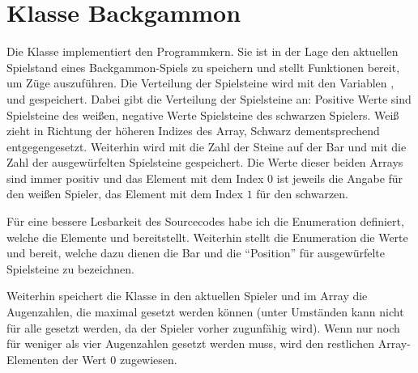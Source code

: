 \chapter{Klasse Backgammon}
Die Klasse  implementiert den Programmkern. Sie ist in der Lage den aktuellen Spielstand eines Backgammon-Spiels zu speichern und stellt Funktionen bereit, um Züge auszuführen. Die Verteilung der Spielsteine wird mit den Variablen ,  und  gespeichert. Dabei gibt  die Verteilung der Spielsteine an: Positive Werte sind Spielsteine des weißen, negative Werte Spielsteine des schwarzen Spielers. Weiß zieht in Richtung der höheren Indizes des Array, Schwarz dementsprechend entgegengesetzt. Weiterhin wird mit  die Zahl der Steine auf der Bar und mit  die Zahl der ausgewürfelten Spielsteine gespeichert. Die Werte dieser beiden Arrays sind immer positiv und das Element mit dem Index $0$ ist jeweils die Angabe für den weißen Spieler, das Element mit dem Index $1$ für den schwarzen.

Für eine bessere Lesbarkeit des Sourcecodes habe ich die Enumeration  definiert, welche die Elemente  und  bereitstellt. Weiterhin stellt die Enumeration  die Werte  und  bereit, welche dazu dienen die Bar und die "`Position"' für ausgewürfelte Spielsteine zu bezeichnen.

Weiterhin speichert die Klasse  in  den aktuellen Spieler und im Array  die Augenzahlen, die maximal gesetzt werden können (unter Umständen kann nicht für alle gesetzt werden, da der Spieler vorher zugunfähig wird). Wenn nur noch für weniger als vier Augenzahlen gesetzt werden muss, wird den restlichen Array-Elementen der Wert $0$ zugewiesen.

